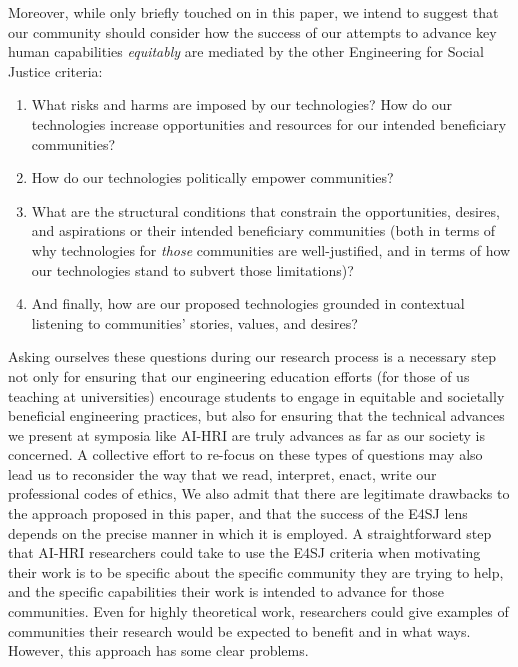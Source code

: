 \documentclass[letterpaper]{article} %
\begin{document}
Moreover, while only briefly touched on in this paper, we intend to suggest that our community should consider how the success of our attempts to advance key human capabilities \textit{equitably} are mediated by the other Engineering for Social Justice criteria: 
\begin{enumerate}
    \item What risks and harms are imposed by our technologies? How do our technologies increase opportunities and resources for our intended beneficiary communities? 
    \item How do our technologies politically empower communities? 
    \item What are the structural conditions that constrain the opportunities, desires, and aspirations or their intended beneficiary communities (both in terms of why technologies for \textit{those} communities are well-justified, and in terms of how our technologies stand to subvert those limitations)? 
    \item And finally, how are our proposed technologies grounded in contextual listening to communities' stories, values, and desires? 
\end{enumerate}
Asking ourselves these questions during our research process is a necessary step not only for ensuring that our engineering education efforts (for those of us teaching at universities) encourage students to engage in equitable and societally beneficial engineering practices, but also for ensuring that the technical advances we present at symposia like AI-HRI are truly advances as far as our society is concerned. A collective effort to re-focus on these types of questions may also lead us to reconsider the way that we read, interpret, enact, write our professional codes of ethics,  
We also admit that there are legitimate drawbacks to the approach proposed in this paper, and that the success of the E4SJ lens depends on the precise manner in which it is employed. A straightforward step that AI-HRI researchers could take to use the E4SJ criteria when motivating their work is to be specific about the specific community they are trying to help, and the specific capabilities their work is intended to advance for those communities. Even for highly theoretical work, researchers could give examples of communities their research would be expected to benefit and in what ways. However, this approach has some clear problems. 
\end{document}
